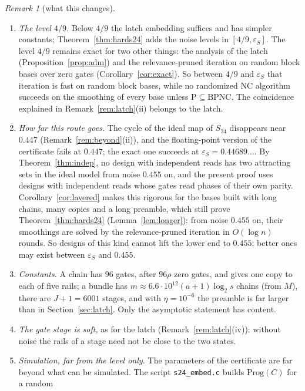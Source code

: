 \documentclass[11pt]{amsart}
\theoremstyle{definition}
\theoremstyle{remark}
\newtheorem{remark}[theorem]{Remark}
\newcommand{\eps}{\varepsilon}
\begin{document}
\begin{remark}[what this changes]\label{rem:s24}
\begin{enumerate}[label=(\roman*),leftmargin=2.4em]
\item \emph{The level $4/9$.} Below $4/9$ the latch embedding suffices and has simpler constants;
Theorem~\ref{thm:hards24} adds the noise levels in $[4/9,\eps_S]$. The level $4/9$ remains exact
for two other things: the analysis of the latch (Proposition~\ref{prop:adm}) and the
relevance-pruned iteration on random block bases over zero gates (Corollary~\ref{cor:exact}).
So between $4/9$ and $\eps_S$ that iteration is fast on random block bases, while no randomized
NC algorithm succeeds on the smoothing of every base unless $\mathrm P\subseteq\mathrm{BPNC}$. The
coincidence explained in Remark~\ref{rem:latch}(ii) belongs to the latch.
\item \emph{How far this route goes.} The cycle of the ideal map of $S_{24}$ disappears near
$0.447$ (Remark~\ref{rem:beyond}(ii)), and the floating-point version of the certificate fails at
$0.447$; the exact one succeeds at $\eps_S=0.44689\ldots$. By Theorem~\ref{thm:indep}, no design with independent reads has two attracting sets in
the ideal model from noise $0.455$ on, and the present proof uses designs with independent reads
whose gates read phases of their own parity. Corollary~\ref{cor:layered} makes this rigorous for
the bases built with long chains, many copies and a long preamble, which still prove
Theorem~\ref{thm:hards24} (Lemma~\ref{lem:longer}): from noise $0.455$ on, their smoothings are solved
by the relevance-pruned iteration in $O(\log n)$ rounds. So designs of this kind cannot lift the
lower end to $0.455$; better ones may exist between $\eps_S$ and $0.455$.
\item \emph{Constants.} A chain has $96$ gates, after $96\rho$ zero gates, and gives one copy to each of
five rails; a bundle has $m\approx6.6\cdot10^{12}(a+1)\log_2s$ chains (from $M$), there are $J+1=6001$ stages, and with
$\eta=10^{-6}$ the preamble is far larger than in Section~\ref{sec:latch}. Only the asymptotic
statement has content.
\item \emph{The gate stage is soft,} as for the latch (Remark~\ref{rem:latch}(iv)): without noise
the rails of a stage need not be close to the two states.
\item \emph{Simulation, far from the level only.} The parameters of the certificate are far beyond
what can be simulated. The script \texttt{s24\_embed.c} builds $\mathrm{Prog}(C)$ for a random

\end{enumerate}
\end{remark}
\end{document}
